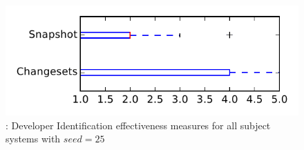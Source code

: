 
\begin{figure}
\centering
\includegraphics[height=0.4\textheight]{figures/dit_seed/rq1_tiny_25}
\caption{\rtwo: Developer Identification effectiveness measures for all subject systems with $seed=25$}
\label{fig:dit_seed:rq1:tiny}
\end{figure}
